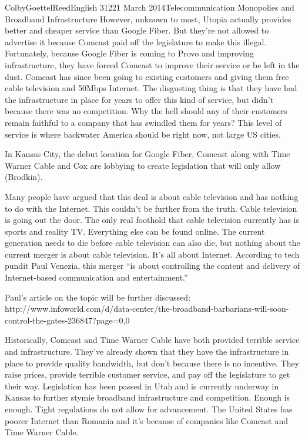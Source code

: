 \documentclass[12pt]{article}
\begin{document}
\begin{mla}{Colby}{Goettel}{Reed}{English 312}{21 March 2014}{Telecommunication Monopolies and Broadband Infrastructure}
However, unknown to most, Utopia actually provides better and cheaper service than Google Fiber. But they're not allowed to advertise it because Comcast paid off the legislature to make this illegal. Fortunately, because Google Fiber is coming to Provo and improving infrastructure, they have forced Comcast to improve their service or be left in the dust. Comcast has since been going to existing customers and giving them free cable television and 50Mbps Internet. The disgusting thing is that they have had the infrastructure in place for years to offer this kind of service, but didn't because there was no competition. Why the hell should any of their customers remain faithful to a company that has swindled them for years? This level of service is where backwater America should be right now, not large US cities.

In Kansas City, the debut location for Google Fiber, Comcast along with Time Warner Cable and Cox are lobbying to create legislation that will only allow  (Brodkin).

Many people have argued that this deal is about cable television and has nothing to do with the Internet. This couldn't be further from the truth. Cable television is going out the door. The only real foothold that cable television currently has is sports and reality TV. Everything else can be found online. The current generation needs to die before cable television can also die, but nothing about the current merger is about cable television. It's all about Internet. According to tech pundit Paul Venezia, this merger ``is about controlling the content and delivery of Internet-based communication and entertainment.''

Paul's article on the topic will be further discussed: http://www.infoworld.com/d/data-center/the-broadband-barbarians-will-soon-control-the-gates-236847?page=0,0

Historically, Comcast and Time Warner Cable have both provided terrible service and infrastructure. They've already shown that they have the infrastructure in place to provide quality bandwidth, but don't because there is no incentive. They raise prices, provide terrible customer service, and pay off the legislature to get their way. Legislation has been passed in Utah and is currently underway in Kansas to further stymie broadband infrastructure and competition. Enough is enough. Tight regulations do not allow for advancement. The United States has poorer Internet than Romania and it's because of companies like Comcast and Time Warner Cable.


\end{mla}
\end{document}

